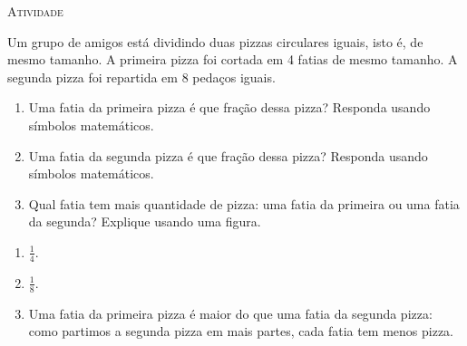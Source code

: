 \documentclass[10 pt,usenames,dvipsnames, oneside]{article}
\begin{document}
\bigskip
\begin{center}
{\large \scshape Atividade}
\end{center}
\fi

Um grupo de amigos está dividindo duas pizzas circulares iguais, isto é, de mesmo tamanho. A primeira pizza foi cortada em 4 fatias de mesmo tamanho. A segunda pizza foi repartida em 8 pedaços iguais.
\begin{enumerate} [label=\alph*)] %
\item Uma fatia da primeira pizza é que fração dessa pizza? Responda usando símbolos matemáticos.
\item Uma fatia da segunda pizza é que fração dessa pizza? Responda usando símbolos matemáticos.
\item Qual fatia tem mais quantidade de pizza: uma fatia da primeira ou uma fatia da segunda? Explique usando uma figura.
\end{enumerate} %

\ifdefined\prof
\clearpage
\begin{solucao}
\begin{enumerate} [label=\alph*)] %
    \item $\displaystyle\frac{1}{4}$.
    \item $\displaystyle\frac{1}{8}$.
    \item Uma fatia da primeira pizza é maior do que uma fatia da segunda pizza: como partimos a segunda pizza em mais partes, cada fatia tem menos pizza.

\begin{figure}[H]
\centering

 \quad \quad
{}
\end{figure}
\end{enumerate} %

\end{solucao}
\fi
\end{document}
